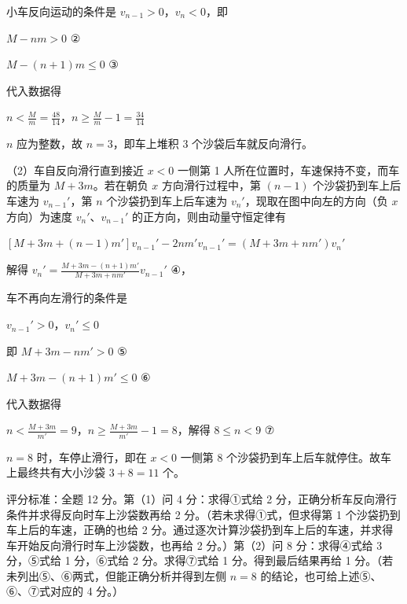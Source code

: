 \documentclass[\gkver]{gaokaozhenti}
\begin{document}
\begin{enumerate}
{小车反向运动的条件是 $v_{n-1}>0$，$v_{n}<0$，即

$M-nm>0$ ②

$M-(n+1)m\leq0$ ③

代入数据得

$n<\frac{M}{m}=\frac{48}{14}$，$n\geq\frac{M}{m}-1=\frac{34}{14}$

$n$ 应为整数，故 $n=3$，即车上堆积 3 个沙袋后车就反向滑行。

（2）车自反向滑行直到接近 $x < 0$ 一侧第 1 人所在位置时，车速保持不变，而车的质量为 $M + 3m$。若在朝负 $x$ 方向滑行过程中，第 $(n-1)$ 个沙袋扔到车上后车速为 $v_{n-1}'$，第 $n$ 个沙袋扔到车上后车速为 $v_{n}'$，现取在图中向左的方向（负 $x$ 方向）为速度 $v_{n}'$、$v_{n-1}'$ 的正方向，则由动量守恒定律有

$[M+3m+(n-1)m']v_{n-1}' - 2nm'v_{n-1}' = (M+3m+nm')v_{n}'$

解得 $v_{n}'=\frac{M+3m-(n+1)m'}{M+3m+nm'}v_{n-1}'$ ④，

车不再向左滑行的条件是

$v_{n-1}' > 0$，$v_{n}' \leqslant 0$

即 $M + 3m - nm' > 0$ ⑤

$M + 3m - (n + 1)m' \leqslant 0$ ⑥

代入数据得

$n<\frac{M+3m}{m'}=9$，$n\geq\frac{M+3m}{m'}-1=8$，解得 $8\leq n<9$ ⑦

$n=8$ 时，车停止滑行，即在 $x<0$ 一侧第 8 个沙袋扔到车上后车就停住。故车上最终共有大小沙袋 $3+8=11$ 个。

评分标准：全题 12 分。第（1）问 4 分：求得①式给 2 分，正确分析车反向滑行条件并求得反向时车上沙袋数再给 2 分。（若未求得①式，但求得第 1 个沙袋扔到车上后的车速，正确的也给 2 分。通过逐次计算沙袋扔到车上后的车速，并求得车开始反向滑行时车上沙袋数，也再给 2 分。）第（2）问 8 分：求得④式给 3 分，⑤式给 1 分，⑥式给 2 分。求得⑦式给 1 分。得到最后结果再给 1 分。（若未列出⑤、⑥两式，但能正确分析并得到左侧 $n=8$ 的结论，也可给上述⑤、⑥、⑦式对应的 4 分。）
}

\end{enumerate}
\end{document}
